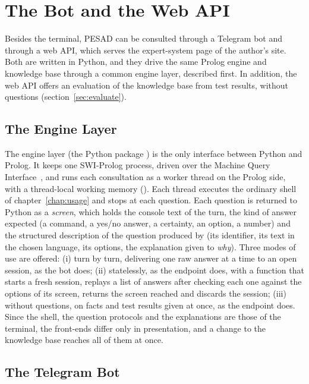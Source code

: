 \chapter{The Bot and the Web API}
\label{chap:interfaces}

Besides the terminal, PESAD can be consulted through a Telegram bot and through
a web API, which serves the expert-system page of the author's site. Both are
written in Python, and they drive the same Prolog engine and knowledge base
through a common engine layer, described first. In addition, the web API offers an
evaluation of the knowledge base from test results, without questions
(section~\ref{sec:evaluate}).

\section{The Engine Layer}

The engine layer (the Python package ) is the only interface
between Python and Prolog. It keeps one SWI-Prolog process, driven over the
Machine Query Interface~\cite{swipl-mqi}, and runs each consultation as a
worker thread on the Prolog side, with a thread-local working memory
(). Each thread executes the ordinary shell of
chapter~\ref{chap:usage} and stops at each question. Each question is returned to
Python as a \emph{screen}, which holds the console text of the turn, the kind of
answer expected (a command, a yes/no answer, a certainty, an option, a number)
and the structured description of the question produced by 
(its identifier, its text in the chosen language, its options, the explanation
given to \emph{why}). Three modes of use are offered: (i) turn by turn,
delivering one raw answer at a time to an open session, as the bot does; (ii)
statelessly, as the  endpoint does, with a function that starts a
fresh session, replays a list of answers after checking each one against the
options of its screen, returns the screen reached and discards the session;
(iii) without questions, on facts and test results given at once, as the
 endpoint does. Since the shell, the question protocols and the
explanations are those of the terminal, the front-ends differ only in
presentation, and a change to the knowledge base reaches all of them at once.

\section{The Telegram Bot}

